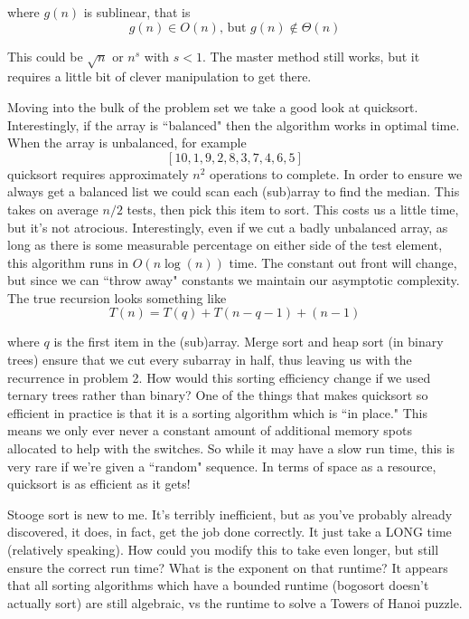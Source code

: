 \documentclass[16 pt]{amsart}
\theoremstyle{definition}
\theoremstyle{remark}
\numberwithin{equation}{subsection}
\begin{document}
where $g(n)$ is sublinear, that is
\[
g(n)\in O(n) \text{, but } g(n)\notin \Theta(n)
\]

This could be $\sqrt{n}$ or $n^{s}$ with $s<1$.  The master method still works, but it requires a little bit of clever manipulation to get there.

\par Moving into the bulk of the problem set we take a good look at quicksort.  Interestingly, if the array is ``balanced" then the algorithm works in optimal time.  When the array is unbalanced, for example
\[
[10,1,9,2,8,3,7,4,6,5]
\]
quicksort requires approximately $n^2$ operations to complete.  In order to ensure we always get a balanced list we could scan each (sub)array to find the median.  This takes on average $n/2$ tests, then pick this item to sort.  This costs us a little time, but it's not atrocious.  Interestingly, even if we cut  a badly unbalanced array, as long as there is some measurable percentage on either side of the test element, this algorithm runs in $O(n\log(n))$ time.  The constant out front will change, but since we can ``throw away" constants we maintain our asymptotic complexity.  The true recursion looks something like
\[
T(n) = T(q) + T(n-q-1) + (n-1)
\]

where $q$ is the first item in the (sub)array.  Merge sort and heap sort (in binary trees) ensure that we cut every subarray in half, thus leaving us with the recurrence in problem 2.  How would this sorting efficiency change if we used ternary trees rather than binary?  One of the things that makes quicksort so efficient in practice is that it is a sorting algorithm which is ``in place."  This means we only ever never a constant amount of additional memory spots allocated to help with the switches.  So while it may have a slow run time, this is very rare if we're given a ``random" sequence.  In terms of space as a resource, quicksort is as efficient as it gets!

\par Stooge sort is new to me.  It's terribly inefficient, but as you've probably already discovered, it does, in fact, get the job done correctly.  It just take a LONG time (relatively speaking). How could you modify this to take even longer, but still ensure the correct run time?  What is the exponent on that runtime?  It appears that all sorting algorithms which have a bounded runtime (bogosort doesn't actually sort) are still algebraic, vs the runtime to solve a Towers of Hanoi puzzle. 
\end{document}
